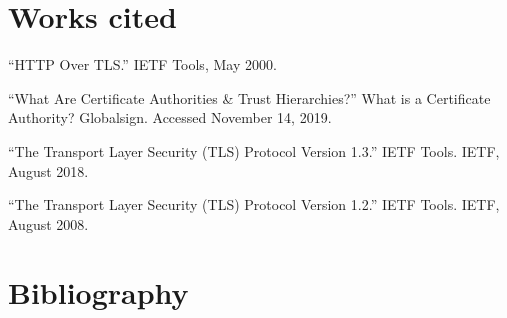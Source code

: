\documentclass[12pt]{article}
\begin{document}
\newpage

\section{Works cited}
\begin{description}[leftmargin=!,itemindent=-15pt]
    \item ``HTTP Over TLS.'' IETF Tools, May 2000. %
    \item ``What Are Certificate Authorities \& Trust Hierarchies?'' What is a Certificate Authority? Globalsign. Accessed November 14, 2019. %
    \item ``The Transport Layer Security (TLS) Protocol Version 1.3.'' IETF Tools. IETF, August 2018. %
    \item ``The Transport Layer Security (TLS) Protocol Version 1.2.'' IETF Tools. IETF, August 2008. %
\end{description}

\newpage

\section{Bibliography}

\end{document}
